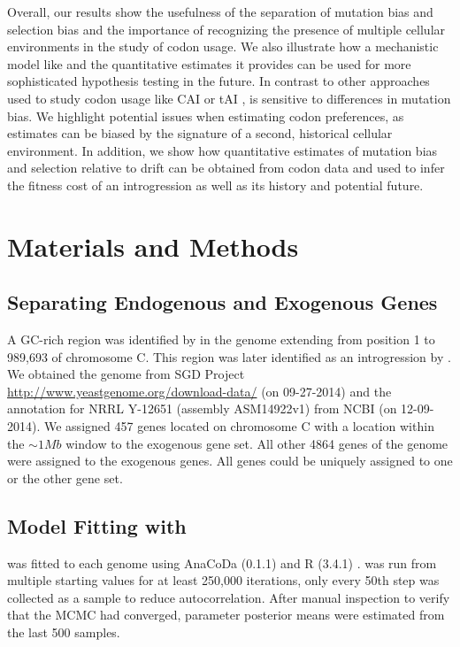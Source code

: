 Overall, our results show the usefulness of the separation of mutation bias and selection bias and the importance of recognizing the presence of multiple cellular environments in the study of codon usage.
We also illustrate how a mechanistic model like \ROC and the quantitative estimates it provides can be used for more sophisticated hypothesis testing in the future.
In contrast to other approaches used to study codon usage like CAI \citep{sharp1987} or tAI \citep{dosreis2003, dosreis2004}, \ROC is sensitive to differences in mutation bias.
We highlight potential issues when estimating codon preferences, as estimates can be biased by the signature of a second, historical cellular environment.
In addition, we show how quantitative estimates of mutation bias and selection relative to drift can be obtained from codon data and used to infer the fitness cost of an introgression as well as its history and potential future.


\section{Materials and Methods}

\subsection{Separating Endogenous and Exogenous Genes}
A GC-rich region was identified by \citet{payen2009} in the \kluyveri genome extending from position 1 to 989,693 of chromosome C.
This region was later identified as an introgression by \citet{friedrich2015}.
We obtained the \kluyveri genome from SGD Project \url{http://www.yeastgenome.org/download-data/} (on 09-27-2014) and the annotation for \kluyveri NRRL Y-12651 (assembly ASM14922v1) from NCBI (on 12-09-2014).
We assigned 457 genes located on chromosome C with a location within the $\sim 1 Mb$ window to the exogenous gene set.
All other 4864 genes of the \kluyveri genome were assigned to the exogenous genes.
All genes could be uniquely assigned to one or the other gene set.

\subsection{Model Fitting with \ROC}
\ROC was fitted to each genome using AnaCoDa (0.1.1) \citep{landerer2018} and R (3.4.1) \citep{rcore}.
\ROC was run from multiple starting values for at least 250,000 iterations, only every 50th step was collected as a sample to reduce autocorrelation. 
After manual inspection to verify that the MCMC had converged, parameter posterior means were estimated from the last 500 samples.


